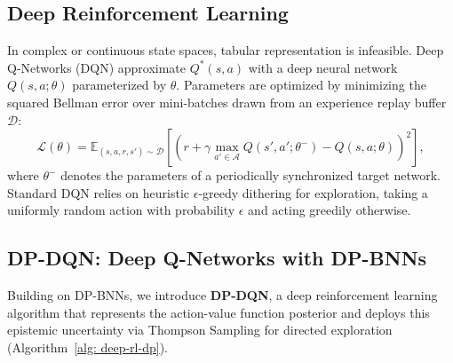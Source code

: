 \documentclass[10pt]{article}
\begin{document}
\subsection{Deep Reinforcement Learning}
In complex or continuous state spaces, tabular representation is infeasible. Deep Q-Networks (DQN) \citep{mnih2015human} approximate $Q^*(s, a)$ with a deep neural network $Q(s, a; \theta)$ parameterized by $\theta$. Parameters are optimized by minimizing the squared Bellman error over mini-batches drawn from an experience replay buffer $\mathcal{D}$:
\begin{equation}\label{eq:DQN-loss}
\mathcal{L}(\theta) = \mathbb{E}_{(s, a, r, s') \sim \mathcal{D}}\left[\left( r + \gamma \max_{a' \in \mathcal{A}} Q(s', a'; \theta^-) - Q(s, a; \theta) \right)^2\right],
\end{equation}
where $\theta^-$ denotes the parameters of a periodically synchronized target network. Standard DQN relies on heuristic $\epsilon$-greedy dithering for exploration, taking a uniformly random action with probability $\epsilon$ and acting greedily otherwise.

\subsection{DP-DQN: Deep Q-Networks with DP-BNNs}
\label{sec:dp-dqn-formulation}

Building on DP-BNNs, we introduce \textbf{DP-DQN}, a deep reinforcement learning algorithm that represents the action-value function posterior and deploys this epistemic uncertainty via Thompson Sampling for directed exploration (Algorithm~\ref{alg: deep-rl-dp}).
\end{document}
